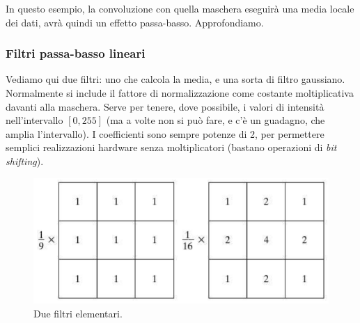 \documentclass[a4paper,11pt]{article}
\begin{document}
In questo esempio, la convoluzione con quella maschera eseguirà una media locale dei dati, avrà quindi un effetto passa-basso. Approfondiamo.

\subsubsection{Filtri passa-basso lineari}
Vediamo qui due filtri: uno che calcola la media, e una sorta di filtro gaussiano.
Normalmente si include il fattore di normalizzazione come costante moltiplicativa davanti alla maschera. Serve per tenere, dove possibile, i valori
di intensità nell'intervallo $[0, 255]$ (ma a volte non si può fare, e c'è un guadagno, che amplia l'intervallo).
I coefficienti sono sempre potenze di 2, per permettere semplici realizzazioni hardware senza moltiplicatori (bastano operazioni di \textit{bit shifting}).

\renewcommand{\thefigure}{5.26}
\begin{figure}[!h]
  \centering
    \includegraphics[scale=0.4]{images/5/two_masks.png}
    \caption{Due filtri elementari.}
\end{figure}
\end{document}
